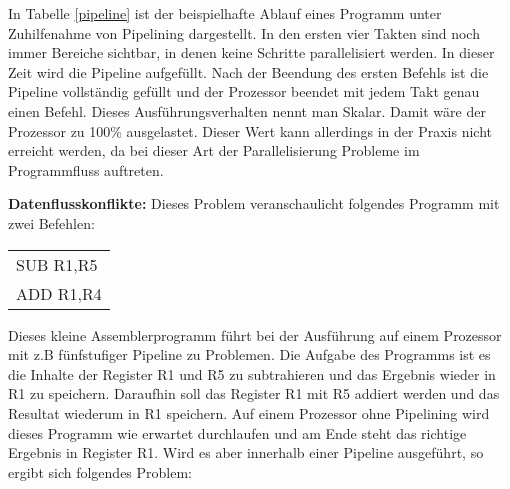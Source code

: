 \documentclass[12pt]{article}
\begin{document}
\noindent In Tabelle \ref{pipeline} ist der beispielhafte Ablauf eines Programm unter Zuhilfenahme von Pipelining dargestellt. In den ersten vier Takten sind noch immer Bereiche sichtbar, in denen keine Schritte parallelisiert werden. In dieser Zeit wird die Pipeline aufgefüllt. Nach der Beendung des ersten Befehls ist die Pipeline vollständig gefüllt und der Prozessor beendet mit jedem Takt genau einen Befehl. Dieses Ausführungsverhalten nennt man Skalar. Damit wäre der Prozessor zu 100\% ausgelastet. Dieser Wert kann allerdings in der Praxis nicht erreicht werden, da bei dieser Art der Parallelisierung Probleme im Programmfluss auftreten.

\par\bigskip\noindent\textbf{Datenflusskonflikte:} Dieses Problem veranschaulicht folgendes Programm mit zwei Befehlen: 

\begin{table}[!htb]
\centering
\label{confliktProgramm}
\begin{tabular}{l}
SUB R1,R5 \\
ADD R1,R4
\end{tabular}
\end{table}

\noindent Dieses kleine Assemblerprogramm führt bei der Ausführung auf einem Prozessor mit z.B fünfstufiger Pipeline zu Problemen. Die Aufgabe des Programms ist es die Inhalte der Register R1 und R5 zu subtrahieren und das Ergebnis wieder in R1 zu speichern. Daraufhin soll das Register R1 mit R5 addiert werden und das Resultat wiederum in R1 speichern. Auf einem Prozessor ohne Pipelining wird dieses Programm wie erwartet durchlaufen und am Ende steht das richtige Ergebnis in Register R1. Wird es aber innerhalb einer Pipeline ausgeführt, so ergibt sich folgendes Problem:
\end{document}
